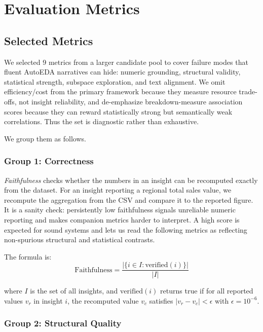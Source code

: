 \documentclass[conference]{IEEEtran}
\begin{document}
\section{Evaluation Metrics}

\subsection{Selected Metrics}

We selected 9 metrics from a larger candidate pool to cover failure modes that fluent AutoEDA narratives can hide: numeric grounding, structural validity, statistical strength, subspace exploration, and text alignment. We omit efficiency/cost from the primary framework because they measure resource trade-offs, not insight reliability, and de-emphasize breakdown-measure association scores because they can reward statistically strong but semantically weak correlations. Thus the set is diagnostic rather than exhaustive.

We group them as follows.

\subsubsection{Group 1: Correctness}

\textit{Faithfulness} checks whether the numbers in an insight can be recomputed exactly from the dataset. For an insight reporting a regional total sales value, we recompute the aggregation from the CSV and compare it to the reported figure. It is a sanity check: persistently low faithfulness signals unreliable numeric reporting and makes companion metrics harder to interpret. A high score is expected for sound systems and lets us read the following metrics as reflecting non-spurious structural and statistical contrasts.

The formula is:
\begin{equation}
\text{Faithfulness} = \frac{|\{i \in I : \text{verified}(i)\}|}{|I|}
\end{equation}

where $I$ is the set of all insights, and $\text{verified}(i)$ returns true if for all reported values $v_r$ in insight $i$, the recomputed value $v_c$ satisfies $|v_r - v_c| < \epsilon$ with $\epsilon = 10^{-6}$.

\subsubsection{Group 2: Structural Quality}
\end{document}
